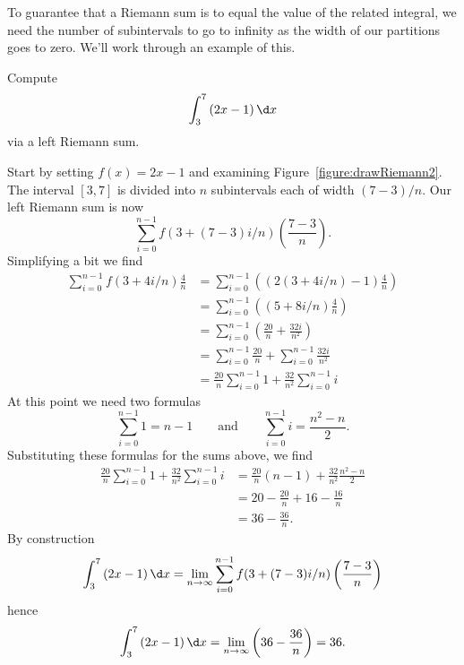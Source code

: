 To guarantee that a Riemann sum is to equal the value of the related
integral, we need the number of subintervals to go to infinity as the
width of our partitions goes to zero. We'll work through an example of
this.

\begin{example}
Compute
\[
\int_3^7 \left(2x-1\right)\d x
\]
via a left Riemann sum.
\end{example}

\begin{solution}
Start by setting $f(x) = 2x-1$ and examining
Figure~\ref{figure:drawRiemann2}.  The interval $[3,7]$ is divided
into $n$ subintervals each of width $(7-3)/n$. Our left Riemann sum is
now
\[
\sum_{i=0}^{n-1} f(3+(7-3)i/n) \left(\frac{7-3}{n}\right).
\]
Simplifying a bit we find
\begin{align*}
\sum_{i=0}^{n-1} f(3+4i/n) \frac{4}{n} &= \sum_{i=0}^{n-1} \left((2(3+4i/n) -1 )\frac{4}{n}\right)\\
&= \sum_{i=0}^{n-1} \left((5+8i/n )\frac{4}{n}\right)\\
&= \sum_{i=0}^{n-1} \left(\frac{20}{n} + \frac{32i}{n^2}\right)\\
&= \sum_{i=0}^{n-1} \frac{20}{n} + \sum_{i=0}^{n-1}\frac{32i}{n^2}\\
&= \frac{20}{n}\sum_{i=0}^{n-1} 1 +\frac{32}{n^2} \sum_{i=0}^{n-1} i
\end{align*}
At this point we need two formulas
\[
\sum_{i=0}^{n-1}1 = n-1 \qquad\text{and}\qquad \sum_{i=0}^{n-1} i = \frac{n^2-n}{2}.
\]
Substituting these formulas for the sums above, we find 
\begin{align*}
\frac{20}{n}\sum_{i=0}^{n-1} 1 +\frac{32}{n^2} \sum_{i=0}^{n-1} i &=\frac{20}{n}(n-1) +\frac{32}{n^2}\frac{n^2-n}{2}\\
&=20 -\frac{20}{n}+16 -\frac{16}{n}\\
&=36 - \frac{36}{n}.
\end{align*}
By construction
\[
\int_3^7 \left(2x-1\right) \d x = \lim_{n\to \infty}\sum_{i=0}^{n-1} f(3+(7-3)i/n) \left(\frac{7-3}{n}\right)
\]
hence
\[
\int_3^7 \left(2x-1 \right)\d x = \lim_{n\to \infty} \left(36 - \frac{36}{n}\right) = 36.
\]
\end{solution}

